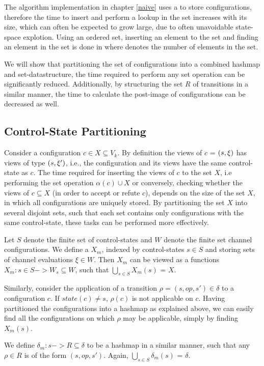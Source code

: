 The algorithm implementation in chapter \ref{naive} uses a  to store configurations, therefore the time to insert and perform a lookup in the set increases with its size, which can often be expected to grow large, due to often unavoidable state-space explotion. Using an ordered set, inserting an element to the set and finding an element in the set is done in  where  denotes the number of elements in the set.

We will show that partitioning the set of configurations into a combined hashmap and set-datastructure, the time required to perform any set operation can be significantly reduced. Additionally, by structuring the set $R$ of transitions in a similar manner, the time to calculate the post-image of configurations can be decreased as well.

\subsection{Control-State Partitioning}
Consider a configuration $c \in X \subseteq V_k$. By definition the views of $c$ = $(s, \xi)$ has views of type $(s,\xi')$, i.e., the configuration and its views have the same control-state as $c$. The time required for inserting the views of $c$ to the set $X$, i.e performing the set operation $\alpha(c) \cup X$ or conversely, checking whether the views of $c \subseteq X$ (in order to accept or refute $c$), depends on the size of the set $X$, in which all configurations are uniquely stored. By partitioning the set $X$ into several disjoint sets, such that each set contains only configurations with the same control-state, these tasks can be performed more effectively.

Let $S$ denote the finite set of control-states and $W$ denote the finite set channel configurations. We define a  $X_m$, indexed by control-states $s \in S$ and storing sets of channel evaluations $\xi \in W$. Then $X_m$ can be viewed as a functions $X_m : s \in S -> W_s \subseteq W$, such that $\bigcup\limits_{s\in S} X_m(s)$ = $X$.

Similarly, consider the application of a transition $\rho = (s, op, s') \in \delta$ to a configuration $c$. If $state(c) \neq s$, $\rho(c)$ is not applicable on $c$. Having partitioned the configurations into a hashmap as explained above, we can easily find all the configurations on which $\rho$ may be applicable, simply by finding $X_m(s)$.

We define $\delta_m : s -> R \subseteq \delta$ to be a hashmap in a similar manner, such that any $\rho \in R$ is of the form $(s, op, s')$. Again, $\bigcup\limits_{s\in S} \delta_m(s)$ = $\delta$.

